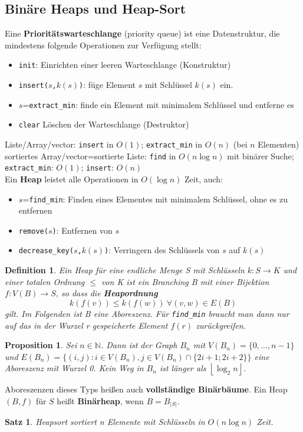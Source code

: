 \documentclass[12pt,a4paper]{article}
\theoremstyle{plain}
\newtheorem{Satz}[Theorem]{Satz}
\newtheorem{Prop}[Theorem]{Proposition}
\newtheorem{Definition}[Theorem]{Definition}
\newcommand{\herv}[1]{{\emph{\textbf{#1}}}}
\newcommand{\N}{\mathbb{N}}
\numberwithin{equation}{section}
\begin{document}
\subsection{Binäre Heaps und Heap-Sort}
Eine \textbf{Prioritätswarteschlange} (priority queue) ist eine Datenstruktur, die mindestens folgende Operationen zur Verfügung stellt:
\begin{itemize}
\item \texttt{init}: Einrichten einer leeren Warteschlange (Konstruktur)
\item \texttt{insert($s$,$k(s)$)}: füge Element $s$ mit Schlüssel $k(s)$ ein.
\item $s$=\texttt{extract\_min}: finde ein Element mit minimalem Schlüssel und entferne es
\item \texttt{clear} Löschen der Warteschlange (Destruktor)
\end{itemize}
Liste/Array/vector: \texttt{insert} in $O(1)$; \texttt{extract\_min} in $O(n)$ (bei $n$ Elementen)\\
sortiertes Array/vector=sortierte Liste: \texttt{find} in $O(n \log n)$ mit binärer Suche; \texttt{extract\_min}: $O(1)$; \texttt{insert}: $O(n)$\\
Ein \textbf{Heap} leistet alle Operationen in $O(\log n)$ Zeit, auch:
\begin{itemize}
\item $s$=\texttt{find\_min}: Finden eines Elementes mit minimalem Schlüssel, ohne es zu entfernen
\item \texttt{remove($s$)}: Entfernen von $s$
\item \texttt{decrease\_key($s$,$k(s)$)}: Verringern des Schlüssels von $s$ auf $k(s)$
\end{itemize}
\begin{Definition}
Ein Heap für eine endliche Menge S mit Schlüsseln $k: S \rightarrow K$ und einer totalen Ordnung $\leq$ von K ist ein Branching B mit einer Bijektion $f: V(B)\rightarrow S$, so dass die \herv{Heapordnung}
\[k(f(v))\leq k(f(w))\ \forall (v,w)\in E(B)\] gilt. Im Folgenden ist B eine Aboreszenz. Für \emph{\texttt{find\_min}} braucht man dann nur auf das in der Wurzel r gespeicherte Element $f(r)$ zurückgreifen.
\end{Definition}
\begin{Prop}
Sei $n\in \N$. Dann ist der Graph $B_n$ mit $V(B_n)=\{0,\ldots,n-1\}$ und $E(B_n)=\{(i,j):i\in V(B_n), j\in V(B_n)\cap \{2i+1;2i+2\}\}$ eine Aboreszenz mit Wurzel 0. Kein Weg in $B_n$ ist länger als $\left\lfloor \log_2 n \right\rfloor$.
\end{Prop}
Aboreszenzen dieses Typs heißen auch \textbf{vollständige Binärbäume}. Ein Heap $(B,f)$ für $S$ heißt \textbf{Binärheap}, wenn $B=B_{|S|}$.
\begin{Satz}
Heapsort sortiert n Elemente mit Schlüsseln in $O(n \log n)$ Zeit.
\end{Satz}
\end{document}
